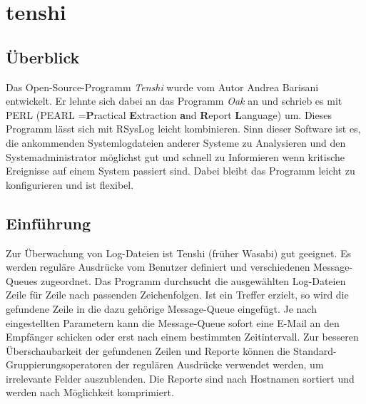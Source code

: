 \section{tenshi}
\subsection{Überblick}
Das Open-Source-Programm \textit{Tenshi} wurde vom Autor Andrea Barisani entwickelt. Er lehnte sich dabei an das Programm \textit{Oak} an und schrieb es mit PERL (PEARL =\textbf{P}ractical \textbf{E}xtraction \textbf{a}nd \textbf{R}eport \textbf{L}anguage) um. Dieses Programm lässt sich mit RSysLog leicht kombinieren. Sinn dieser Software ist es, die ankommenden Systemlogdateien anderer Systeme zu Analysieren und den Systemadministrator möglichst gut und schnell zu Informieren wenn kritische Ereignisse auf einem System passiert sind. Dabei bleibt das Programm leicht zu konfigurieren und ist flexibel.

\subsection{Einführung}
Zur Überwachung von Log-Dateien ist Tenshi (früher Wasabi) gut geeignet. Es werden reguläre Ausdrücke vom Benutzer definiert und verschiedenen Message-Queues zugeordnet. Das Programm durchsucht die ausgewählten Log-Dateien Zeile für Zeile nach passenden Zeichenfolgen. Ist ein Treffer erzielt, so wird die gefundene Zeile in die dazu gehörige Message-Queue eingefügt. Je nach eingestellten Parametern kann die Message-Queue sofort eine E-Mail an den Empfänger schicken oder erst nach einem bestimmten Zeitintervall. 
Zur besseren Überschaubarkeit der gefundenen Zeilen und Reporte können die Standard-Gruppierungsoperatoren der regulären Ausdrücke verwendet werden, um irrelevante Felder auszublenden. 
Die Reporte sind nach Hostnamen sortiert und werden nach Möglichkeit komprimiert. \cite{TenshiDescription}